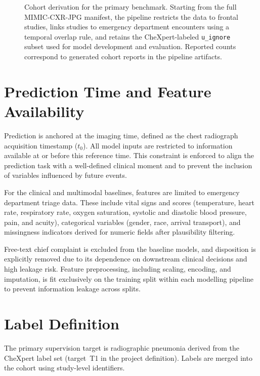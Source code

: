 \begin{figure}[htbp]
    \caption{Cohort derivation for the primary benchmark. Starting from the full MIMIC-CXR-JPG manifest, the pipeline restricts the data to frontal studies, links studies to emergency department encounters using a temporal overlap rule, and retains the CheXpert-labeled \texttt{u\_ignore} subset used for model development and evaluation. Reported counts correspond to generated cohort reports in the pipeline artifacts.}
    \label{fig:cohort_flow}
\end{figure}

\section{Prediction Time and Feature Availability}

Prediction is anchored at the imaging time, defined as the chest radiograph acquisition timestamp ($t_0$). All model inputs are restricted to information available at or before this reference time. This constraint is enforced to align the prediction task with a well-defined clinical moment and to prevent the inclusion of variables influenced by future events.

For the clinical and multimodal baselines, features are limited to emergency department triage data. These include vital signs and scores (temperature, heart rate, respiratory rate, oxygen saturation, systolic and diastolic blood pressure, pain, and acuity), categorical variables (gender, race, arrival transport), and missingness indicators derived for numeric fields after plausibility filtering.

Free-text chief complaint is excluded from the baseline models, and disposition is explicitly removed due to its dependence on downstream clinical decisions and high leakage risk. Feature preprocessing, including scaling, encoding, and imputation, is fit exclusively on the training split within each modelling pipeline to prevent information leakage across splits.

\section{Label Definition}

The primary supervision target is radiographic pneumonia derived from the CheXpert label set (target~T1 in the project definition). Labels are merged into the cohort using study-level identifiers.

